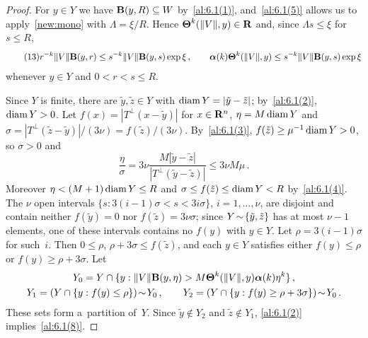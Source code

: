 \begin{proof}
    For $y \in Y$ we have $\mathbf{B}(y,R) \subseteq W$ by~\ref{al:6.1(1)}, and~\ref{al:6.1(5)}
    allows us to apply~\ref{new:mono} with $\Lambda = \xi / R$. Hence
    $\boldsymbol{\Theta}^{k}(\|V\|,y) \in \mathbf{R}$ and, since $\Lambda s \le \xi$ for $s \le R$,
    \begin{equation}
        \tag{13} \label{al:6.1(13)}
        r^{-k} \|V\| \mathbf{B}(y,r) \le s^{-k} \|V\| \mathbf{B}(y,s) \exp \xi \,, \qquad
        \boldsymbol{\alpha}(k) \boldsymbol{\Theta}^{k}(\|V\|,y) \le s^{-k} \|V\| \mathbf{B}(y,s) \exp \xi
    \end{equation}
    whenever $y \in Y$ and $0 < r < s \le R$.

    Since $Y$ is finite, there are $\tilde y, \tilde z \in Y$ with $\operatorname{diam} Y = |\tilde y - \tilde
    z|$; by~\ref{al:6.1(2)}, $\operatorname{diam} Y > 0$. Let $f(x) = |T^\perp(x - \tilde y)|$ for $x \in
    \mathbf{R}^{n}$, $\eta = M \operatorname{diam} Y$ and $\sigma = |T^\perp(\tilde z - \tilde y)| / (3\nu) = f(\tilde
    z)/(3\nu)$. By~\ref{al:6.1(3)}, $f(\tilde z) \ge \mu^{-1} \operatorname{diam} Y > 0$, so $\sigma > 0$ and
    \begin{equation}
        \tag{14} \label{al:6.1(14)}
        \frac{\eta}{\sigma} = 3 \nu \frac{M |\tilde y - \tilde z|}{|T^\perp(\tilde y - \tilde
        z)|} \le 3 \nu M \mu \,.
    \end{equation}
    Moreover $\eta < (M+1) \operatorname{diam} Y \le R$ and $\sigma \le f(\tilde z) \le \operatorname{diam} Y < R$
    by~\ref{al:6.1(4)}. The $\nu$ open intervals $\{ s : 3 (i-1) \sigma < s < 3 i \sigma \}$, $i =
    1, \ldots, \nu$, are disjoint and contain neither $f(\tilde y) = 0$ nor $f(\tilde z) = 3 \nu
    \sigma$; since $Y \!\sim\! \{ \tilde y, \tilde z \}$ has at most $\nu - 1$ elements, one of
    these intervals contains no $f(y)$ with $y \in Y$. Let $\rho = 3(i-1) \sigma$ for such~$i$.
    Then $0 \le \rho$, $\rho + 3 \sigma \le f(\tilde z)$, and each $y \in Y$ satisfies either $f(y)
    \le \rho$ or $f(y) \ge \rho + 3 \sigma$. Let
    \begin{gather*}
        Y_0 = Y \cap \{ y : \|V\| \mathbf{B}(y,\eta) > M \boldsymbol{\Theta}^{k}(\|V\|,y)
        \boldsymbol{\alpha}(k) \eta^{k} \} \,, \\
        Y_1 = (Y \cap \{ y : f(y) \le \rho \}) \!\sim\! Y_0 \,, \qquad Y_2 = (Y \cap \{ y : f(y)
        \ge \rho + 3 \sigma \}) \!\sim\! Y_0 \,.
    \end{gather*}
    These sets form a~partition of~$Y$. Since $\tilde y \notin Y_2$ and $\tilde z \notin Y_1$,
    \ref{al:6.1(2)} implies~\ref{al:6.1(8)}.


\end{proof}
